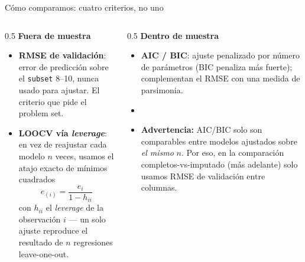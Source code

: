 \documentclass[aspectratio=169]{beamer}
\begin{document}
\begin{frame}{Cómo comparamos: cuatro criterios, no uno}
  \begin{columns}[T]
    \begin{column}{0.5\textwidth}
      \textbf{Fuera de muestra}
      \begin{itemize}
        \item \textbf{RMSE de validación}: error de predicción sobre el
          \texttt{subset} 8--10, nunca usado para ajustar. El criterio que
          pide el problem set.
        \item \textbf{LOOCV vía \emph{leverage}}: en vez de reajustar cada
          modelo $n$ veces, usamos el atajo exacto de mínimos cuadrados
          \[e_{(i)} = \frac{e_i}{1-h_{ii}}\]
          con $h_{ii}$ el \emph{leverage} de la observación $i$ --- un solo
          ajuste reproduce el resultado de $n$ regresiones leave-one-out.
      \end{itemize}
    \end{column}
    \begin{column}{0.5\textwidth}
      \textbf{Dentro de muestra}
      \begin{itemize}
        \item \textbf{AIC / BIC}: ajuste penalizado por número de parámetros
          (BIC penaliza más fuerte); complementan el RMSE con una medida de
          parsimonia.
        \item[]
        \item \textcolor{predpurple}{\textbf{Advertencia:}} AIC/BIC solo son
          comparables entre modelos ajustados sobre \emph{el mismo} $n$. Por
          eso, en la comparación completos-vs-imputado (más adelante) solo
          usamos RMSE de validación entre columnas.
      \end{itemize}
    \end{column}
  \end{columns}
\end{frame}
\end{document}
